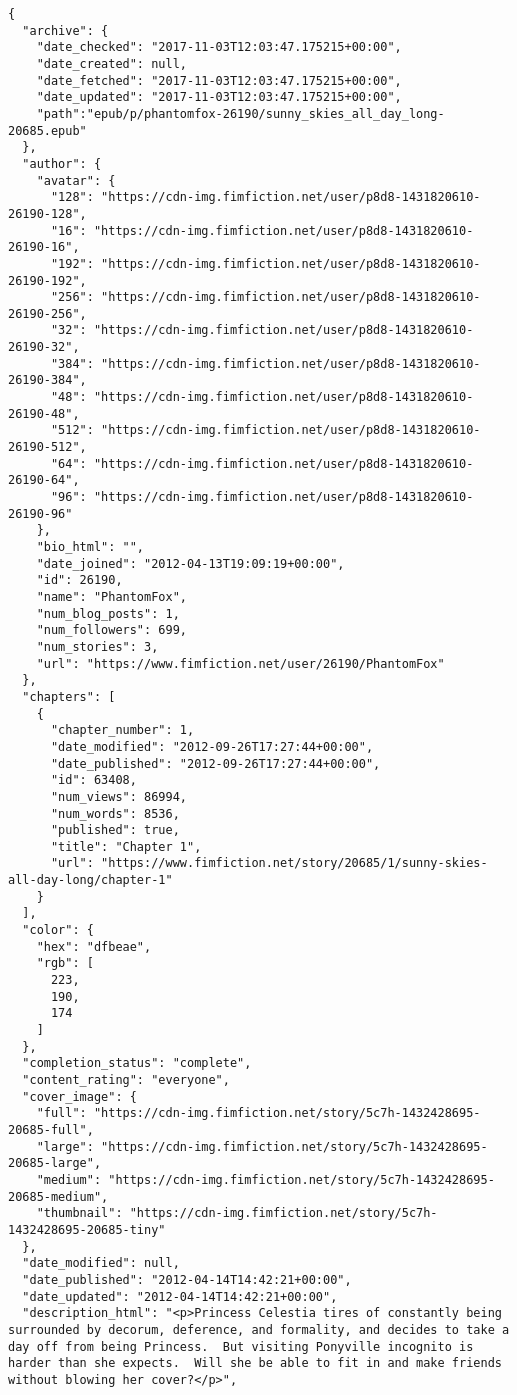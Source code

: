 \documentclass[hidelinks,a4paper,12pt]{article}
\begin{document}
\begin{lstlisting}[breaklines, basicstyle=\ttfamily\small, columns=flexible]
{
  "archive": {
    "date_checked": "2017-11-03T12:03:47.175215+00:00",
    "date_created": null,
    "date_fetched": "2017-11-03T12:03:47.175215+00:00",
    "date_updated": "2017-11-03T12:03:47.175215+00:00",
    "path":"epub/p/phantomfox-26190/sunny_skies_all_day_long-20685.epub"
  },
  "author": {
    "avatar": {
      "128": "https://cdn-img.fimfiction.net/user/p8d8-1431820610-26190-128",
      "16": "https://cdn-img.fimfiction.net/user/p8d8-1431820610-26190-16",
      "192": "https://cdn-img.fimfiction.net/user/p8d8-1431820610-26190-192",
      "256": "https://cdn-img.fimfiction.net/user/p8d8-1431820610-26190-256",
      "32": "https://cdn-img.fimfiction.net/user/p8d8-1431820610-26190-32",
      "384": "https://cdn-img.fimfiction.net/user/p8d8-1431820610-26190-384",
      "48": "https://cdn-img.fimfiction.net/user/p8d8-1431820610-26190-48",
      "512": "https://cdn-img.fimfiction.net/user/p8d8-1431820610-26190-512",
      "64": "https://cdn-img.fimfiction.net/user/p8d8-1431820610-26190-64",
      "96": "https://cdn-img.fimfiction.net/user/p8d8-1431820610-26190-96"
    },
    "bio_html": "",
    "date_joined": "2012-04-13T19:09:19+00:00",
    "id": 26190,
    "name": "PhantomFox",
    "num_blog_posts": 1,
    "num_followers": 699,
    "num_stories": 3,
    "url": "https://www.fimfiction.net/user/26190/PhantomFox"
  },
  "chapters": [
    {
      "chapter_number": 1,
      "date_modified": "2012-09-26T17:27:44+00:00",
      "date_published": "2012-09-26T17:27:44+00:00",
      "id": 63408,
      "num_views": 86994,
      "num_words": 8536,
      "published": true,
      "title": "Chapter 1",
      "url": "https://www.fimfiction.net/story/20685/1/sunny-skies-all-day-long/chapter-1"
    }
  ],
  "color": {
    "hex": "dfbeae",
    "rgb": [
      223,
      190,
      174
    ]
  },
  "completion_status": "complete",
  "content_rating": "everyone",
  "cover_image": {
    "full": "https://cdn-img.fimfiction.net/story/5c7h-1432428695-20685-full",
    "large": "https://cdn-img.fimfiction.net/story/5c7h-1432428695-20685-large",
    "medium": "https://cdn-img.fimfiction.net/story/5c7h-1432428695-20685-medium",
    "thumbnail": "https://cdn-img.fimfiction.net/story/5c7h-1432428695-20685-tiny"
  },
  "date_modified": null,
  "date_published": "2012-04-14T14:42:21+00:00",
  "date_updated": "2012-04-14T14:42:21+00:00",
  "description_html": "<p>Princess Celestia tires of constantly being surrounded by decorum, deference, and formality, and decides to take a day off from being Princess.  But visiting Ponyville incognito is harder than she expects.  Will she be able to fit in and make friends without blowing her cover?</p>",

\end{lstlisting}
\end{document}
